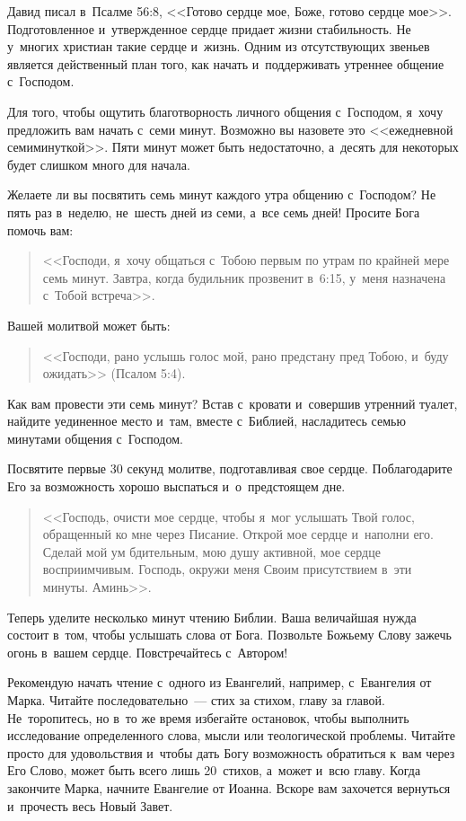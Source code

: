 \documentclass[11pt,article,a4paper,fittopage,oneside]{article}
\begin{document}
\begin{multicols}{2}
Давид писал в~Псалме 56:8, <<Готово сердце мое, Боже, готово сердце мое>>. Подготовленное и~утвержденное сердце придает жизни стабильность. Не у~многих христиан такие сердце и~жизнь. Одним из отсутствующих звеньев является действенный план того, как начать и~поддерживать утреннее общение с~Господом.

Для того, чтобы ощутить благотворность личного общения с~Господом, я~хочу предложить вам начать с~семи минут. Возможно вы назовете это <<ежедневной семиминуткой>>. Пяти минут может быть недостаточно, а~десять для некоторых будет слишком много для начала.

Желаете ли вы посвятить семь минут каждого утра общению с~Господом? Не пять раз в~неделю, не~шесть дней из семи, а~все семь дней! Просите Бога помочь вам: \begin{quote}
<<Господи, я~хочу общаться с~Тобою первым по утрам по крайней мере семь минут. Завтра, когда будильник прозвенит в~6:15, у~меня назначена с~Тобой встреча>>.
\end{quote}

Вашей молитвой может быть:

\begin{quote}
<<Господи, рано услышь голос мой, рано предстану пред Тобою, и~буду ожидать>> (Псалом 5:4).
\end{quote}

Как вам провести эти семь минут? Встав с~кровати и~совершив утренний туалет, найдите уединенное место и~там, вместе с~Библией, насладитесь семью минутами общения с~Господом.

Посвятите первые 30 секунд молитве, подготавливая свое сердце. Поблагодарите Его за возможность хорошо выспаться и~о~предстоящем дне. \begin{quote}<<Господь, очисти мое сердце, чтобы я~мог услышать Твой голос, обращенный ко мне через Писание. Открой мое сердце и~наполни его. Сделай мой ум бдительным, мою душу активной, мое сердце восприимчивым. Господь, окружи меня Своим присутствием в~эти минуты. Аминь>>.\end{quote}

Теперь уделите несколько минут чтению Библии. Ваша величайшая нужда состоит в~том, чтобы услышать слова от Бога. Позвольте Божьему Слову зажечь огонь в~вашем сердце. Повстречайтесь с~Автором!

Рекомендую начать чтение с~одного из Евангелий, например, с~Евангелия от Марка. Читайте последовательно~--- стих за стихом, главу за главой. Не~торопитесь, но в~то же время избегайте остановок, чтобы выполнить исследование определенного слова, мысли или теологической проблемы. Читайте просто для удовольствия и~чтобы дать Богу возможность обратиться к~вам через Его Слово, может быть всего лишь 20~стихов, а~может и~всю главу. Когда закончите Марка, начните Евангелие от Иоанна. Вскоре вам захочется вернуться и~прочесть весь Новый Завет.


\end{multicols}
\end{document}
